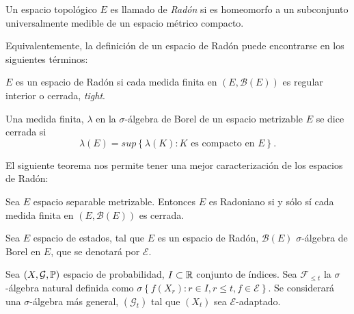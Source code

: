 \begin{Def}
Un espacio topol\'ogico $E$ es llamado de {\em Rad\'on} si es
homeomorfo a un subconjunto universalmente medible de un espacio
m\'etrico compacto.
\end{Def}

Equivalentemente, la definici\'on de un espacio de Rad\'on puede
encontrarse en los siguientes t\'erminos:

\begin{Def}
$E$ es un espacio de Rad\'on si cada medida finita en
$\left(E,\mathcal{B}\left(E\right)\right)$ es regular interior o
cerrada, {\em tight}.
\end{Def}

\begin{Def}
Una medida finita, $\lambda$ en la $\sigma$-\'algebra de Borel de
un espacio metrizable $E$ se dice cerrada si
\begin{equation}\label{Eq.A2.3}
\lambda\left(E\right)=sup\left\{\lambda\left(K\right):K\textrm{ es
compacto en }E\right\}.
\end{equation}
\end{Def}

El siguiente teorema nos permite tener una mejor caracterizaci\'on
de los espacios de Rad\'on:
\begin{Teo}\label{Tma.A2.2}
Sea $E$ espacio separable metrizable. Entonces $E$ es Radoniano si
y s\'olo s\'i cada medida finita en
$\left(E,\mathcal{B}\left(E\right)\right)$ es cerrada.
\end{Teo}


Sea $E$ espacio de estados, tal que $E$ es un espacio de Rad\'on,
$\mathcal{B}\left(E\right)$ $\sigma$-\'algebra de Borel en $E$,
que se denotar\'a por $\mathcal{E}$.

Sea $\left(X,\mathcal{G},\mathbb{P}\right)$ espacio de probabilidad,
$I\subset\mathbb{R}$ conjunto de índices. Sea $\mathcal{F}_{\leq
t}$ la $\sigma$-\'algebra natural definida como
$\sigma\left\{f\left(X_{r}\right):r\in I, r\leq
t,f\in\mathcal{E}\right\}$. Se considerar\'a una
$\sigma$-\'algebra m\'as general, $ \left(\mathcal{G}_{t}\right)$
tal que $\left(X_{t}\right)$ sea $\mathcal{E}$-adaptado.

